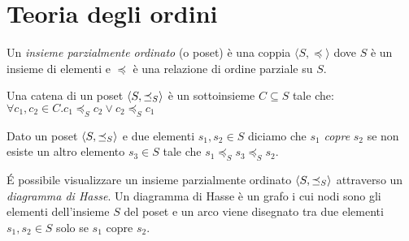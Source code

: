 \section{Teoria degli ordini}
\begin{definition}
Un \textit{insieme parzialmente ordinato} (o poset) è una coppia \(\langle S, \preceq\rangle\) dove \(S\) è un insieme di elementi e \(\preceq\) è una relazione di ordine parziale su \(S\).
\end{definition}

\begin{definition}[Catena]
Una catena di un poset \(\langle S, \preceq_{S}\rangle\) è un sottoinsieme \(C\subseteq S\) tale che: \(\forall c_1, c_2 \in C. c_1\preceq_{S} c_2 \vee c_2\preceq_{S} c_1\)
\end{definition}

\begin{definition}[Copertura]
Dato un poset \(\langle S, \preceq_{S}\rangle\) e due elementi \(s_1, s_2 \in S\) diciamo che \(s_1\) \textit{copre} \(s_2\) se non esiste un altro elemento \(s_3\in S\) tale che \(s_1 \preceq_{S} s_3 \preceq_{S} s_2\).
\end{definition}

\begin{definition}
\'E possibile visualizzare un insieme parzialmente ordinato \(\langle S, \preceq_{S}\rangle\) attraverso un \textit{diagramma di Hasse}. Un diagramma di Hasse è un grafo i cui nodi sono gli elementi dell'insieme \(S\) del poset e un arco viene disegnato tra due elementi \(s_1, s_2 \in S\) solo se \(s_1\) copre \(s_2\).
\end{definition}

